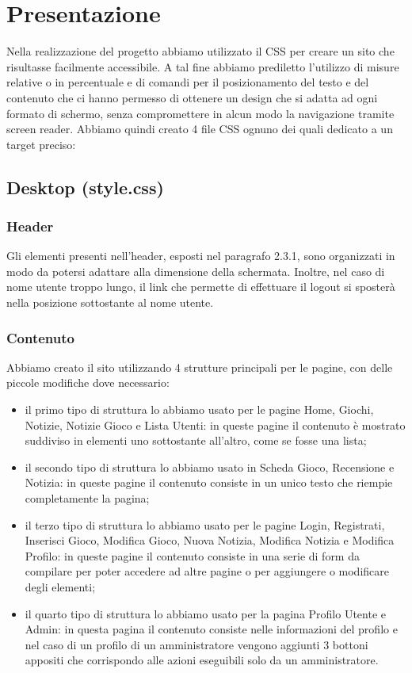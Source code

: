 \section{Presentazione}

Nella realizzazione del progetto abbiamo utilizzato il CSS per creare un sito che risultasse facilmente accessibile. A tal fine abbiamo prediletto l’utilizzo di misure relative o in percentuale e di comandi per il posizionamento del testo e del contenuto che ci hanno permesso di ottenere un design che si adatta ad ogni formato di schermo, senza compromettere in alcun modo la navigazione tramite screen reader.
Abbiamo quindi creato 4 file CSS ognuno dei quali dedicato a un target preciso:

\subsection{Desktop (style.css)}

\subsubsection{Header}
Gli elementi presenti nell'header, esposti nel paragrafo 2.3.1, sono organizzati in modo da potersi adattare alla dimensione della schermata. Inoltre, nel caso di nome utente troppo lungo, il link che permette di effettuare il logout si sposterà nella posizione sottostante al nome utente.

\subsubsection{Contenuto}
Abbiamo creato il sito utilizzando 4 strutture principali per le pagine, con delle piccole modifiche dove necessario:
\begin{itemize}
	\item il primo tipo di struttura lo abbiamo usato per le pagine Home, Giochi, Notizie, Notizie Gioco e Lista Utenti: in queste pagine il contenuto è mostrato suddiviso in elementi uno sottostante all’altro, come se fosse una lista;
	\item il secondo tipo di struttura lo abbiamo usato in Scheda Gioco, Recensione e Notizia: in queste pagine il contenuto consiste in un unico testo che riempie completamente la pagina;
	\item il terzo tipo di struttura lo abbiamo usato per le pagine Login, Registrati, Inserisci Gioco, Modifica Gioco, Nuova Notizia, Modifica Notizia e Modifica Profilo: in queste pagine il contenuto consiste in una serie di form da compilare per poter accedere ad altre pagine o per aggiungere o modificare degli elementi;
	\item il quarto tipo di struttura lo abbiamo usato per la pagina Profilo Utente e Admin: in questa pagina il contenuto consiste nelle informazioni del profilo e nel caso di un profilo di un amministratore vengono aggiunti 3 bottoni appositi che corrispondo alle azioni eseguibili solo da un amministratore.
\end{itemize}

